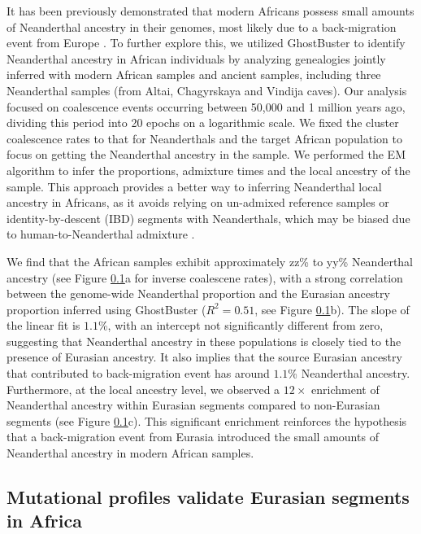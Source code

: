 It has been previously demonstrated that modern Africans possess small amounts of Neanderthal ancestry in their genomes, most likely due to a back-migration event from Europe \cite{chen2020identifying, bergstrom2020insights, wang2013apparent, hollfelder2017northeast}. To further explore this, we utilized GhostBuster to identify Neanderthal ancestry in African individuals by analyzing genealogies jointly inferred with modern African samples and ancient samples, including three Neanderthal samples (from Altai, Chagyrskaya and Vindija caves). Our analysis focused on coalescence events occurring between 50,000 and 1 million years ago, dividing this period into 20 epochs on a logarithmic scale. We fixed the cluster coalescence rates to that for Neanderthals and the target African population to focus on getting the Neanderthal ancestry in the sample. We performed the EM algorithm to infer the proportions, admixture times and the local ancestry of the sample. This approach provides a better way to inferring Neanderthal local ancestry in Africans, as it avoids relying on un-admixed reference samples or identity-by-descent (IBD) segments with Neanderthals, which may be biased due to human-to-Neanderthal admixture \cite{chen2020identifying}.

We find that the African samples exhibit approximately zz\% to yy\% Neanderthal ancestry (see Figure \ref{}a for inverse coalescene rates), with a strong correlation between the genome-wide Neanderthal proportion and the Eurasian ancestry proportion inferred using GhostBuster ($R^2 = 0.51$, see Figure \ref{}b). The slope of the linear fit is $1.1$\%, with an intercept not significantly different from zero, suggesting that Neanderthal ancestry in these populations is closely tied to the presence of Eurasian ancestry. It also implies that the source Eurasian ancestry that contributed to back-migration event has around $1.1$\% Neanderthal ancestry. Furthermore, at the local ancestry level, we observed a $12 \times$ enrichment of Neanderthal ancestry within Eurasian segments compared to non-Eurasian segments (see Figure \ref{}c). This significant enrichment reinforces the hypothesis that a back-migration event from Eurasia introduced the small amounts of Neanderthal ancestry in modern African samples. 

\subsection{Mutational profiles validate Eurasian segments in Africa}

